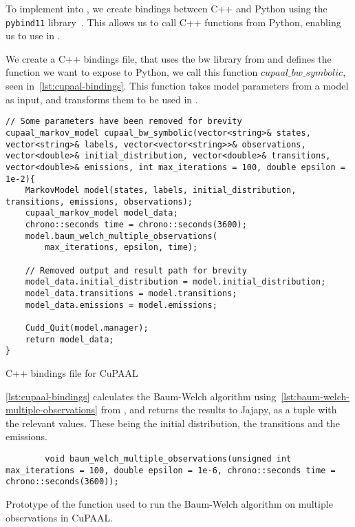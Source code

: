 To implement \Cupaal into \Jajapy, we create bindings between C++ and Python using the \texttt{pybind11} library~\cite{pybind11github}.
This allows us to call C++ functions from Python, enabling us to use \Cupaal in \Jajapy.

We create a C++ bindings file, that uses the \gls{bw} library from \Cupaal and defines the function we want to expose to Python, we call this function $cupaal\_bw\_symbolic$, seen in~\autoref{lst:cupaal-bindings}.
This function takes model parameters from a \Jajapy model as input, and transforms them to be used in \Cupaal.

\begin{listing}[htb!]
    \begin{verbatim}
// Some parameters have been removed for brevity
cupaal_markov_model cupaal_bw_symbolic(vector<string>& states, vector<string>& labels, vector<vector<string>>& observations, vector<double>& initial_distribution, vector<double>& transitions, vector<double>& emissions, int max_iterations = 100, double epsilon = 1e-2){
    MarkovModel model(states, labels, initial_distribution, transitions, emissions, observations);
    cupaal_markov_model model_data;
    chrono::seconds time = chrono::seconds(3600);
    model.baum_welch_multiple_observations(
        max_iterations, epsilon, time);

    // Removed output and result path for brevity
    model_data.initial_distribution = model.initial_distribution;
    model_data.transitions = model.transitions;
    model_data.emissions = model.emissions;
    
    Cudd_Quit(model.manager);
    return model_data;
}
      \end{verbatim}
    \caption{C++ bindings file for CuPAAL}
    \label{lst:cupaal-bindings}
\end{listing}

\autoref{lst:cupaal-bindings} calculates the Baum-Welch algorithm using~\autoref{lst:baum-welch-multiple-observations} from \Cupaal, and returns the results to Jajapy, as a tuple with the relevant values.
These being the initial distribution, the transitions and the emissions.

\begin{listing}[htb!]
    \begin{verbatim}
        void baum_welch_multiple_observations(unsigned int max_iterations = 100, double epsilon = 1e-6, chrono::seconds time = chrono::seconds(3600));
        \end{verbatim}
    \caption{Prototype of the function used to run the Baum-Welch algorithm on multiple observations in CuPAAL.}
    \label{lst:baum-welch-multiple-observations}
\end{listing}

